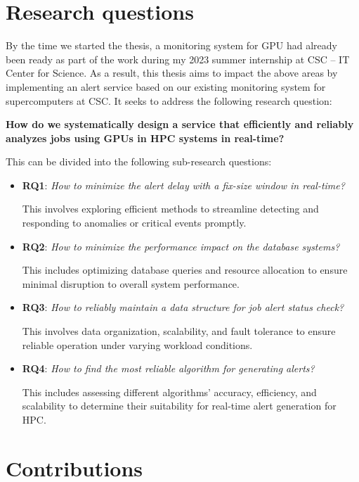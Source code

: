 \section{Research questions}
\label{sec:rqs}
By the time we started the thesis, a monitoring system for GPU had already been ready as part of the work during my 2023 summer internship at CSC -- IT Center for Science. As a result, this thesis aims to impact the above areas by implementing an alert service based on our existing monitoring system for supercomputers at CSC. It seeks to address the following research question:

\textbf{
How do we systematically design a service that efficiently and reliably analyzes jobs using GPUs in HPC systems in real-time?
}

This can be divided into the following sub-research questions:

\begin{itemize}
    \item \textbf{RQ1}: \textit{How to minimize the alert delay with a fix-size window in real-time?}

This involves exploring efficient methods to streamline detecting and responding to anomalies or critical events promptly.

    \item \textbf{RQ2}: \textit{How to minimize the performance impact on the database systems?}

This includes optimizing database queries and resource allocation to ensure minimal disruption to overall system performance.

    \item \textbf{RQ3}: \textit{How to reliably maintain a data structure for job alert status check?}

This involves data organization, scalability, and fault tolerance to ensure reliable operation under varying workload conditions.
    
    \item \textbf{RQ4}: \textit{How to find the most reliable algorithm for generating alerts?}

This includes assessing different algorithms' accuracy, efficiency, and scalability to determine their suitability for real-time alert generation for HPC.

\end{itemize}


\section{Contributions}

